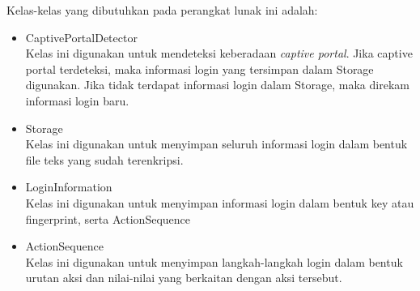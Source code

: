 \documentclass[a4paper,twoside]{article}
\begin{document}
\begin{enumerate}
        Kelas-kelas yang dibutuhkan pada perangkat lunak ini adalah:
        
        \begin{itemize}
            \item{CaptivePortalDetector\\Kelas ini digunakan untuk mendeteksi keberadaan \textit{captive portal}. Jika captive portal terdeteksi, maka informasi login yang tersimpan dalam Storage digunakan. Jika tidak terdapat informasi login dalam Storage, maka direkam informasi login baru.}
            \item{Storage\\Kelas ini digunakan untuk menyimpan seluruh informasi login dalam bentuk file teks yang sudah terenkripsi.}
            \item{LoginInformation\\Kelas ini digunakan untuk menyimpan informasi login dalam bentuk key atau fingerprint, serta ActionSequence}
            \item{ActionSequence\\Kelas ini digunakan untuk menyimpan langkah-langkah login dalam bentuk urutan aksi dan nilai-nilai yang berkaitan dengan aksi tersebut.}
        \end{itemize}


\end{enumerate}
\end{document}
